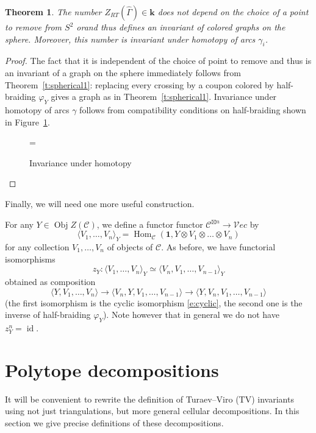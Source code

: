\documentclass{amsart}
\newtheorem{theorem}{Theorem}[section]
\theoremstyle{definition}
\theoremstyle{remark}
\numberwithin{equation}{section}
\newcommand{\firef}[1]{Figure~{\rm\ref{#1}}}
\newcommand{\thref}[1]{Theorem~{\rm\ref{#1}}}
\newcommand{\<}{\langle}
\renewcommand{\>}{\rangle}
\newcommand{\one}{\mathbf{1}}
\newcommand{\kk}{\mathbf{k}}       %
\newcommand{\C}{\mathcal{C}}      %
\newcommand{\Vect}{\mathcal{V}ec}  %
\newcommand{\ga}{\gamma}
\newcommand{\Ga}{\Gamma}
\newcommand{\ph}{\varphi}
\DeclareMathOperator{\id}{id}
\DeclareMathOperator{\Hom}{Hom}
\DeclareMathOperator{\Obj}{Obj}
\begin{document}
 
\begin{theorem}\label{t:spherical2}
  The number $Z_{RT}(\hat\Ga)\in \kk$ does not depend on the choice of a
  point to remove from $S^2$ orand thus defines an
  invariant of colored graphs on the sphere. Moreover, this number is
  invariant under homotopy of arcs $\ga_i$. 
\end{theorem}
\begin{proof}
The fact that it is independent of the choice of point to remove and thus
is an invariant of a graph on the sphere immediately follows from
\thref{t:spherical1}: replacing every crossing by a coupon colored by
half-braiding $\ph_Y$ gives a graph as in \thref{t:spherical1}. Invariance
under homotopy of arcs $\ga$ follows from compatibility conditions on
half-braiding shown in \firef{f:homotopy}.
\begin{figure}[ht]
\qquad \tzHomotopyI\qquad =\qquad \tzHomotopyII
\caption{Invariance under homotopy}\label{f:homotopy}
\end{figure}


\end{proof}


Finally, we will need one more useful construction.

For any  $Y\in \Obj Z(\C)$, we define a functor
functor $\C^{\boxtimes n}\to \Vect$ by
\begin{equation}\label{e:vev-Z}
 \<V_1,\dots,V_n\>_Y=\Hom_\C(\one,Y\otimes  V_1\otimes\dots\otimes V_n)
\end{equation}
for any collection $V_1,\dots, V_n$ of objects of $\C$. As before, we have
functorial isomorphisms 
\begin{equation}\label{e:cyclic-Z}
 z_Y\colon\<V_1,\dots,V_n\>_Y\simeq \<V_n, V_1,\dots,V_{n-1}\>_Y
\end{equation}
obtained as composition 
$$
\<Y,V_1,\dots,V_n\>\to \<V_n, Y, V_1,\dots,V_{n-1}\>\to 
\<Y, V_n, V_1,\dots,V_{n-1}\>
$$
(the first isomorphism is the cyclic isomorphism \eqref{e:cyclic}, the
second one is the inverse of half-braiding $\ph_Y$). Note however that
in general  we do not have $z_Y^n=\id$. 

\section{Polytope decompositions}\label{s:polytope}

It will be convenient to rewrite the definition of Turaev--Viro (TV) 
invariants using not just triangulations, but more general cellular
decompositions. 
In this section we give precise definitions of these decompositions.
\end{document}
